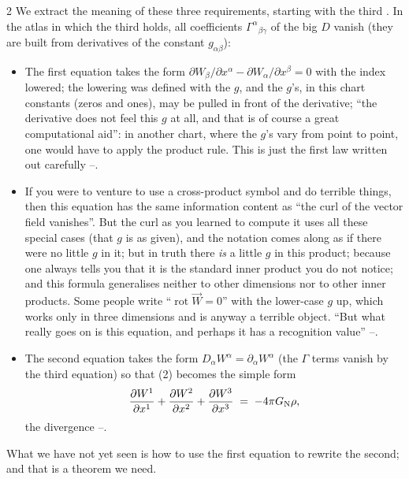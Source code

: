 \begin{paracol}{2}
We extract the meaning of these three requirements, starting with the third . In the atlas in which the third holds, all coefficients $\Gamma^\alpha{}_{\beta\gamma}$ of the big $D$ vanish (they are built from derivatives of the constant $g_{\alpha\beta}$): 
\begin{itemize}
  \item The first equation takes the form $\partial W_\beta/\partial x^\alpha-\partial W_\alpha/\partial x^\beta=0$ with the index lowered; the lowering was defined with the $g$, and the $g$'s, in this chart constants (zeros and ones), may be pulled in front of the derivative; ``the derivative does not feel this $g$ at all, and that is of course a great computational aid'': in another chart, where the $g$'s vary from point to point, one would have to apply the product rule.
        This is just the first law written out carefully --.
  \item If you were to venture to use a cross-product symbol and do terrible things, then this equation has the same information content as ``the curl of the vector field vanishes''. But the curl as you learned to compute it uses all these special cases (that $g$ is as given), and the notation comes along as if there were no little $g$ in it; but in truth there \emph{is} a little $g$ in this product;
        because one always tells you that it is the standard inner product you do not notice; and this formula generalises neither to other dimensions nor to other inner products. Some people write ``$\operatorname{rot}\vec W=0$'' with the lower-case $g$ up, which works only in three dimensions and is anyway a terrible object. ``But what really goes on is this equation, and perhaps it has a recognition value'' --.
  \item The second equation takes the form $D_\alpha W^\alpha=\partial_\alpha W^\alpha$ (the $\Gamma$ terms vanish by the third equation) so that (2) becomes the simple form
        \begin{equation}\label{eq:ng-gauss-flat}
          \frac{\partial W^1}{\partial x^1}+\frac{\partial W^2}{\partial x^2}+\frac{\partial W^3}{\partial x^3}\;=\;-4\pi G_{\rm N}\rho ,
        \end{equation}
        the divergence --.
\end{itemize}
What we have not yet seen is how to use the first equation to rewrite the second; and that is a theorem we need.


\end{paracol}
